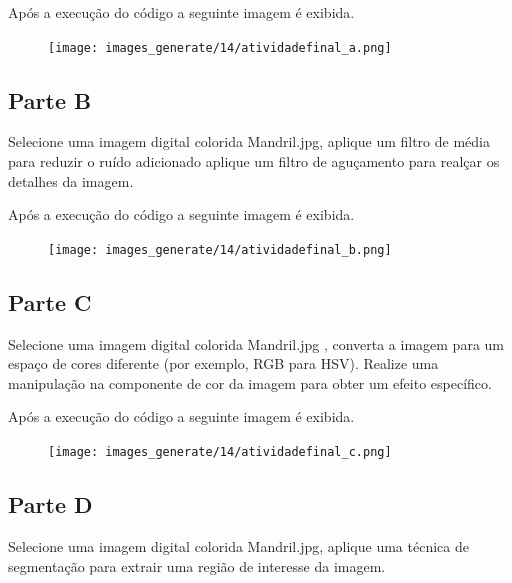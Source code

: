 \documentclass[10pt,a4paper]{article}
\begin{document}


Após a execução do código a seguinte imagem é exibida.

\begin{figure}[H]
    \centering
    {{\texttt{[image: images\_generate/14/atividadefinal\_a.png]}}}
\end{figure}

\subsection{Parte B}

Selecione uma imagem digital colorida Mandril.jpg, aplique um filtro de média para reduzir o ruído adicionado aplique um filtro de aguçamento para realçar os detalhes da imagem. 



Após a execução do código a seguinte imagem é exibida.

\begin{figure}[H]
    \centering
    {{\texttt{[image: images\_generate/14/atividadefinal\_b.png]}}}
\end{figure}


\subsection{Parte C}

Selecione uma imagem digital colorida Mandril.jpg , converta a imagem para um espaço de cores diferente (por exemplo, RGB para HSV). Realize uma manipulação na componente de cor da imagem para obter um efeito específico. 



Após a execução do código a seguinte imagem é exibida.

\begin{figure}[H]
    \centering
    {{\texttt{[image: images\_generate/14/atividadefinal\_c.png]}}}
\end{figure}



\subsection{Parte D}

Selecione uma imagem digital colorida Mandril.jpg, aplique uma técnica de segmentação para extrair uma região de interesse da imagem.
\end{document}
